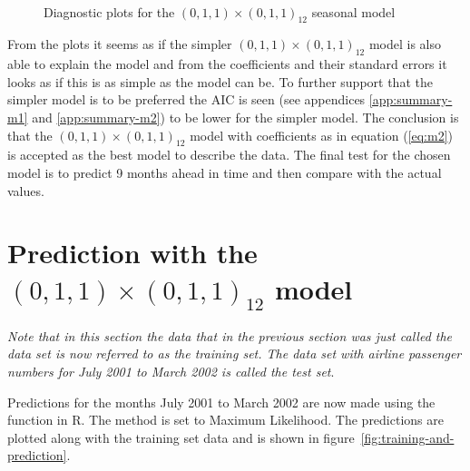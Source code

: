 \begin{figure}
{         \quad 
    }
    \mbox{%
    }
    \caption{Diagnostic plots for the $(0,1,1)\times(0,1,1)_{12}$ seasonal model}
    \label{fig:diagnostics-m2}
\end{figure}

From the plots it seems as if the simpler $(0,1,1)\times(0,1,1)_{12}$ model is
also able to explain the model and from the coefficients and their standard
errors it looks as if this is as simple as the model can be. To further support
that the simpler model is to be preferred the AIC is seen (see appendices
\ref{app:summary-m1} and \ref{app:summary-m2}) to be lower for the simpler
model. The conclusion is that the $(0,1,1)\times(0,1,1)_{12}$ model with
coefficients as in equation (\ref{eq:m2}) is accepted as the best model to
describe the data. The final test for the chosen model is to predict 9 months
ahead in time and then compare with the actual values.


\section*{Prediction with the $(0,1,1)\times(0,1,1)_{12}$ model}

\textit{Note that in this section the data that in the previous section was
just called the data set is now referred to as the training set. The data set
with airline passenger numbers for July 2001 to March 2002 is called the test
set}.\par 

Predictions for the months July 2001 to March 2002 are now made using the
 function in R. The method is set to Maximum Likelihood.
The predictions are plotted along with the training set data and is shown in
figure~\ref{fig:training-and-prediction}.\par

